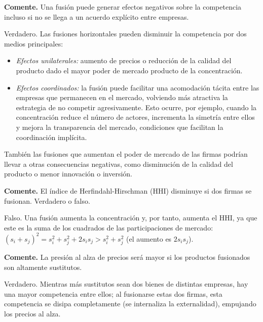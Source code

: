\question \textbf{Comente.} Una fusión puede generar efectos negativos sobre la competencia incluso si no se llega a un acuerdo explícito entre empresas.
\begin{solution}
Verdadero. Las fusiones horizontales pueden disminuir la competencia por dos medios principales:
\begin{itemize}
  \item \emph{Efectos unilaterales:} aumento de precios o reducción de la calidad del producto dado el mayor poder de mercado producto de la concentración.
  \item \emph{Efectos coordinados:} la fusión puede facilitar una acomodación tácita entre las empresas que permanecen en el mercado, volviendo más atractiva la estrategia de no competir agresivamente. Esto ocurre, por ejemplo, cuando la concentración reduce el número de actores, incrementa la simetría entre ellos y mejora la transparencia del mercado, condiciones que facilitan la coordinación implícita.
\end{itemize}
También las fusiones que aumentan el poder de mercado de las firmas podrían llevar a otras consecuencias negativas, como disminución de la calidad del producto o menor innovación o inversión.

\end{solution}

\question \textbf{Comente.} El índice de Herfindahl-Hirschman (HHI) disminuye si dos firmas se fusionan. Verdadero o falso.
\begin{solution}
Falso. Una fusión aumenta la concentración y, por tanto, aumenta el HHI, ya que este es la suma de los cuadrados de las participaciones de mercado: $(s_i + s_j)^2 = s_i^2 + s_j^2 + 2s_is_j > s_i^2 + s_j^2$ (el aumento es $2s_is_j$).

\end{solution}

\question \textbf{Comente.} La presión al alza de precios será mayor si los productos fusionados son altamente sustitutos.
\begin{solution}
Verdadero. Mientras más sustitutos sean dos bienes de distintas empresas, hay una mayor competencia entre ellos; al fusionarse estas dos firmas, esta competencia se disipa completamente (se internaliza la externalidad), empujando los precios al alza.

\end{solution}

